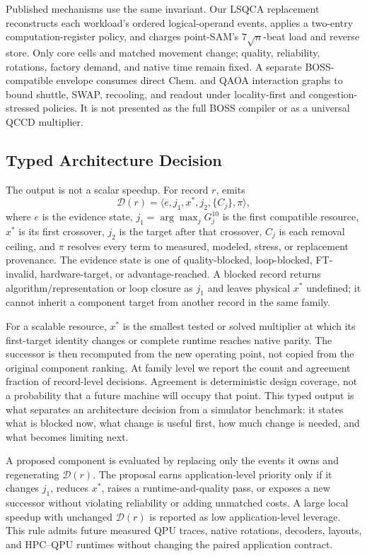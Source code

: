 Published mechanisms use the same invariant. Our LSQCA replacement reconstructs each workload's ordered logical-operand events, applies a two-entry computation-register policy, and charges point-SAM's $7\sqrt{n}$-beat load and reverse store. Only core cells and matched movement change; quality, reliability, rotations, factory demand, and native time remain fixed. A separate BOSS-compatible envelope consumes direct Chem. and QAOA interaction graphs to bound shuttle, SWAP, recooling, and readout under locality-first and congestion-stressed policies. It is not presented as the full BOSS compiler or as a universal QCCD multiplier.

\subsection{Typed Architecture Decision}

The output is not a scalar speedup. For record $r$, \SystemName emits
\[
\mathcal{D}(r)=\langle e,j_1,x^*,j_2,\{C_j\},\pi\rangle,
\]
where $e$ is the evidence state, $j_1=\arg\max_j G_j^{10}$ is the first compatible resource, $x^*$ is its first crossover, $j_2$ is the target after that crossover, $C_j$ is each removal ceiling, and $\pi$ resolves every term to measured, modeled, stress, or replacement provenance. The evidence state is one of quality-blocked, loop-blocked, FT-invalid, hardware-target, or advantage-reached. A blocked record returns algorithm/representation or loop closure as $j_1$ and leaves physical $x^*$ undefined; it cannot inherit a component target from another record in the same family.

For a scalable resource, $x^*$ is the smallest tested or solved multiplier at which its first-target identity changes or complete runtime reaches native parity. The successor is then recomputed from the new operating point, not copied from the original component ranking. At family level we report the count and agreement fraction of record-level decisions. Agreement is deterministic design coverage, not a probability that a future machine will occupy that point. This typed output is what separates an architecture decision from a simulator benchmark: it states what is blocked now, what change is useful first, how much change is needed, and what becomes limiting next.

A proposed component is evaluated by replacing only the events it owns and regenerating $\mathcal{D}(r)$. The proposal earns application-level priority only if it changes $j_1$, reduces $x^*$, raises a runtime-and-quality pass, or exposes a new successor without violating reliability or adding unmatched costs. A large local speedup with unchanged $\mathcal{D}(r)$ is reported as low application-level leverage. This rule admits future measured QPU traces, native rotations, decoders, layouts, and HPC--QPU runtimes without changing the paired application contract.

